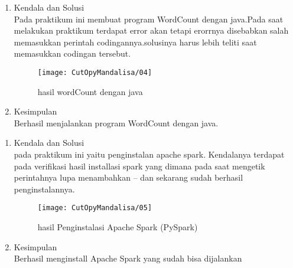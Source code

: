 \begin{enumerate}
\item Kendala dan Solusi\\
Pada praktikum ini membuat program WordCount dengan java.Pada saat melakukan praktikum terdapat error akan tetapi erorrnya disebabkan salah memasukkan perintah codingannya.solusinya harus lebih teliti saat memasukkan codingan tersebut.

\begin{figure}[!ht]
\texttt{[image: CutOpyMandalisa/04]}
\caption{hasil wordCount dengan java}
\label{gam:perkuliahan-25-11}
\end{figure}

\item Kesimpulan\\
Berhasil menjalankan program WordCount dengan java.
\end{enumerate}


\begin{enumerate}
\item Kendala dan Solusi\\
pada praktikum ini yaitu penginstalan apache spark. Kendalanya terdapat pada verifikasi hasil installasi spark yang dimana pada saat mengetik perintahnya lupa menambahkan -- dan sekarang sudah berhasil penginstalannya.

\begin{figure}[!ht]
\texttt{[image: CutOpyMandalisa/05]}
\caption{hasil Penginstalasi Apache Spark (PySpark)}
\label{gam:perkuliahan-15-12}
\end{figure}

\item Kesimpulan\\
Berhasil menginstall Apache Spark yang sudah bisa dijalankan
\end{enumerate}


